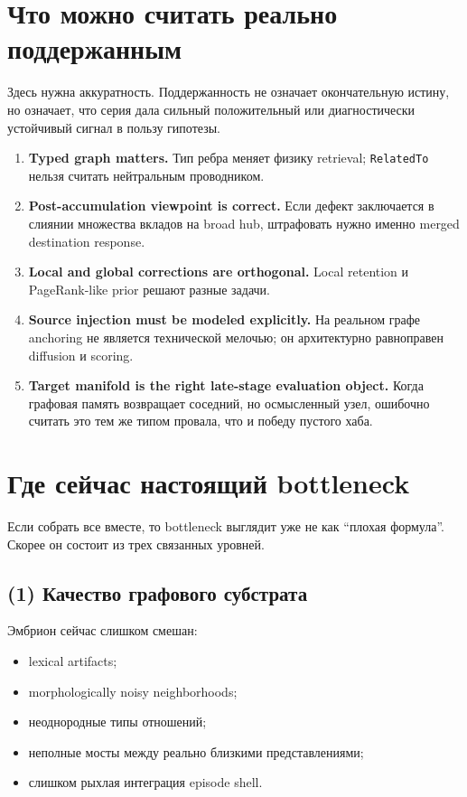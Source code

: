 \section{Что можно считать реально поддержанным}

Здесь нужна аккуратность. Поддержанность не означает окончательную истину, но
означает, что серия дала сильный положительный или диагностически устойчивый
сигнал в пользу гипотезы.

\begin{enumerate}[leftmargin=2em]
\item \textbf{Typed graph matters.} Тип ребра меняет физику retrieval;
\texttt{RelatedTo} нельзя считать нейтральным проводником.
\item \textbf{Post-accumulation viewpoint is correct.} Если дефект заключается в
слиянии множества вкладов на broad hub, штрафовать нужно именно merged
destination response.
\item \textbf{Local and global corrections are orthogonal.} Local retention и
PageRank-like prior решают разные задачи.
\item \textbf{Source injection must be modeled explicitly.} На реальном графе
anchoring не является технической мелочью; он архитектурно равноправен diffusion
и scoring.
\item \textbf{Target manifold is the right late-stage evaluation object.} Когда
графовая память возвращает соседний, но осмысленный узел, ошибочно считать это
тем же типом провала, что и победу пустого хаба.
\end{enumerate}

\section{Где сейчас настоящий bottleneck}

Если собрать все вместе, то bottleneck выглядит уже не как ``плохая формула''.
Скорее он состоит из трех связанных уровней.

\subsection{(1) Качество графового субстрата}

Эмбрион сейчас слишком смешан:

\begin{itemize}[leftmargin=2em]
\item lexical artifacts;
\item morphologically noisy neighborhoods;
\item неоднородные типы отношений;
\item неполные мосты между реально близкими представлениями;
\item слишком рыхлая интеграция episode shell.
\end{itemize}

